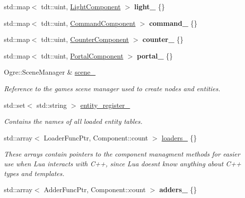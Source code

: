 \begin{DoxyCompactItemize}
\item 
std\+::map$<$ tdt\+::uint, \hyperlink{struct_light_component}{Light\+Component} $>$ {\bfseries light\+\_\+} \{\}\hypertarget{class_entity_system_a30cd01a437a64e9799832727c04275c3}{}\label{class_entity_system_a30cd01a437a64e9799832727c04275c3}

\item 
std\+::map$<$ tdt\+::uint, \hyperlink{struct_command_component}{Command\+Component} $>$ {\bfseries command\+\_\+} \{\}\hypertarget{class_entity_system_a4f5b4cf88feb6f4b16d2b79f0befe438}{}\label{class_entity_system_a4f5b4cf88feb6f4b16d2b79f0befe438}

\item 
std\+::map$<$ tdt\+::uint, \hyperlink{struct_counter_component}{Counter\+Component} $>$ {\bfseries counter\+\_\+} \{\}\hypertarget{class_entity_system_a521265ed5a5bcb74ab95c497c2b66674}{}\label{class_entity_system_a521265ed5a5bcb74ab95c497c2b66674}

\item 
std\+::map$<$ tdt\+::uint, \hyperlink{struct_portal_component}{Portal\+Component} $>$ {\bfseries portal\+\_\+} \{\}\hypertarget{class_entity_system_a90105de0a5de01f1d14a133131d8e071}{}\label{class_entity_system_a90105de0a5de01f1d14a133131d8e071}

\item 
Ogre\+::\+Scene\+Manager \& \hyperlink{class_entity_system_a50f05baee9a67a5a7c5828b4eaf57bb4}{scene\+\_\+}
\begin{DoxyCompactList}\small\item\em Reference to the game\textquotesingle{}s scene manager used to create nodes and entities. \end{DoxyCompactList}\item 
std\+::set$<$ std\+::string $>$ \hyperlink{class_entity_system_a9a0d1920f8346e07201faf8d6c5b1ecf}{entity\+\_\+register\+\_\+}
\begin{DoxyCompactList}\small\item\em Contains the names of all loaded entity tables. \end{DoxyCompactList}\item 
std\+::array$<$ Loader\+Func\+Ptr, Component\+::count $>$ \hyperlink{class_entity_system_a9cbec81dd83f34d230c540abcdf387f4}{loaders\+\_\+} \{\}
\begin{DoxyCompactList}\small\item\em These arrays contain pointers to the component managment methods for easier use when Lua interacts with C++, since Lua doesn\textquotesingle{}t know anything about C++ types and templates. \end{DoxyCompactList}\item 
std\+::array$<$ Adder\+Func\+Ptr, Component\+::count $>$ {\bfseries adders\+\_\+} \{\}\hypertarget{class_entity_system_a62b68e0504b700089d193ef1a0101393}{}\label{class_entity_system_a62b68e0504b700089d193ef1a0101393}


\end{DoxyCompactItemize}
